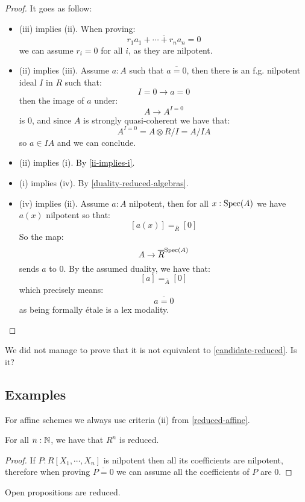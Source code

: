 \begin{proof}
It goes as follow:
\begin{itemize}
\item (iii) implies (ii). When proving:
\[\overline{r_1a_1+\cdots+r_na_n = 0}\]
we can assume $r_i=0$ for all $i$, as they are nilpotent.
\item (ii) implies (iii). Assume $a:A$ such that $\overline{a=0}$, then there is an f.g. nilpotent ideal $I$ in $R$ such that:
\[I=0 \to a=0\]
then the image of $a$ under:
\[A\to A^{I=0}\]
is $0$, and since $A$ is strongly quasi-coherent we have that:
\[A^{I=0} = A\otimes R/I = A/IA\]
so $a\in IA$ and we can conclude.
\item (ii) implies (i). By \cref{ii-implies-i}.
\item (i) implies (iv). By \cref{duality-reduced-algebras}.
\item (iv) implies (ii). Assume $a:A$ nilpotent, then for all $x:\operatorname{Spec}(A)$ we have $a(x)$ nilpotent so that:
\[ [a(x)] =_{\overline{R}} [0]\]
So the map:
\[A \to \overline{R}^{\operatorname{Spec}(A)}\] 
sends $a$ to $0$. By the assumed duality, we have that:
\[ [a] =_{\overline{A}} [0]\]
which precisely means:
\[\overline{a=0}\]
as being formally étale is a lex modality.
\end{itemize}
\end{proof}

\begin{remark}
We did not manage to prove that it is not equivalent to \cref{candidate-reduced}. Is it?
\end{remark}

\subsection{Examples}

For affine schemes we always use criteria (ii) from \cref{reduced-affine}.

\begin{lemma}
For all $n:\mathbb{N}$, we have that $R^n$ is reduced.
\end{lemma}

\begin{proof}
If $P:R[X_1,\cdots,X_n]$ is nilpotent then all its coefficients are nilpotent, therefore when proving $\overline{P=0}$ we can assume all the coefficients of $P$ are $0$.
\end{proof}

\begin{lemma}
Open propositions are reduced.
\end{lemma}

